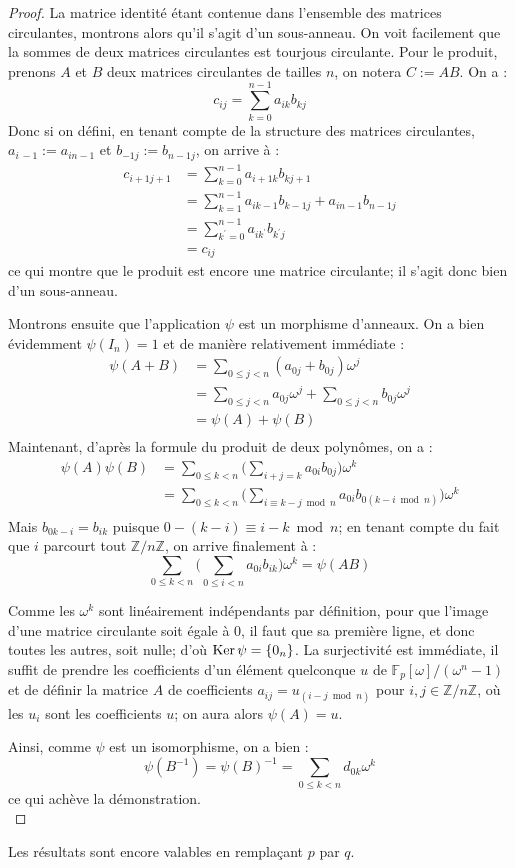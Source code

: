 \documentclass[a4paper]{article} %
\numberwithin{equation}{section}
\newcommand\zmodn[1]{\mathbb{Z}/#1\mathbb{Z}}
\newcommand\GF[1]{\mathbb{F}_{#1}}
\begin{document}
\begin{proof}
La matrice identité étant contenue dans l'ensemble des matrices circulantes, montrons alors qu'il s'agit d'un sous-anneau. On voit facilement que la sommes de deux matrices circulantes est tourjous circulante. Pour le produit, prenons $A$ et $B$ deux matrices circulantes de tailles $n$, on notera $C := AB$. On a :
\[c_{ij} = \sum_{k=0}^{n-1}{a_{ik}b_{kj}}\]
Donc si on défini, en tenant compte de la structure des matrices circulantes, $a_{i\,-1} := a_{in-1}$ et $b_{-1j} := b_{n-1j}$, on arrive à :
\begin{align*}
c_{i+1j+1} &= \sum_{k=0}^{n-1}{a_{i+1k}b_{kj+1}}\\
&= \sum_{k=1}^{n-1}{a_{ik-1}b_{k-1j}} + a_{in-1}b_{n-1j}\\
&= \sum_{k^{\prime}=0}^{n-1}{a_{ik^{\prime}}b_{k^{\prime}j}}\\
&= c_{ij}
\end{align*}
ce qui montre que le produit est encore une matrice circulante; il s'agit donc bien d'un sous-anneau.\par
Montrons ensuite que l'application $\psi$ est un morphisme d'anneaux. On a bien évidemment $\psi(I_n) = 1$ et de manière relativement immédiate :
\begin{align*}
\psi(A + B) &= \sum_{0\leq j < n}{(a_{0j} + b_{0j})\omega^j}\\
&= \sum_{0\leq j < n}{a_{0j}\omega^j} + \sum_{0\leq j < n}{b_{0j}\omega^j}\\
&= \psi(A) + \psi(B)\\
\end{align*}
Maintenant, d'après la formule du produit de deux polynômes, on a :
\begin{align*}
\psi(A)\psi(B) &= \sum_{0\leq k < n}{\bigg(\sum_{i+j=k}{a_{0i}b_{0j}}\bigg)\omega^k}\\
&= \sum_{0\leq k < n}{\bigg(\sum_{i\equiv k-j \bmod n}{a_{0i}b_{0(k-i \bmod n)}}\bigg)\omega^k}\\
\end{align*}
Mais $b_{0k-i} = b_{ik}$ puisque $0 -(k-i) \equiv i-k \bmod n$; en tenant compte du fait que $i$ parcourt tout $\zmodn{n}$, on arrive finalement à :
\[\sum_{0\leq k < n}{\bigg(\sum_{0\leq i < n}{a_{0i}b_{ik}}\bigg)\omega^k} = \psi(AB)\]\par
Comme les $\omega^k$ sont linéairement indépendants par définition, pour que l'image d'une matrice circulante soit égale à $0$, il faut que sa première ligne, et donc toutes les autres, soit nulle; d'où $\textup{Ker}\,\psi = \{0_n\}$. La surjectivité est immédiate, il suffit de prendre les coefficients d'un élément quelconque $u$ de $\GF{p}[\omega]/(\omega^n - 1)$ et de définir la matrice $A$ de coefficients $a_{ij} = u_{(i-j \bmod n)}$ pour $i,j\in\zmodn{n}$, où les $u_i$ sont les coefficients $u$; on aura alors $\psi(A) = u$.\\\par
Ainsi, comme $\psi$ est un isomorphisme, on a bien :
\[\psi(B^{-1}) = \psi(B)^{-1} = \sum_{0\leq k < n}{d_{0k}\omega^k}\]
ce qui achève la démonstration.\\
\end{proof}
\begin{rem}
Les résultats sont encore valables en remplaçant $p$ par $q$.
\end{rem}
\end{document}
